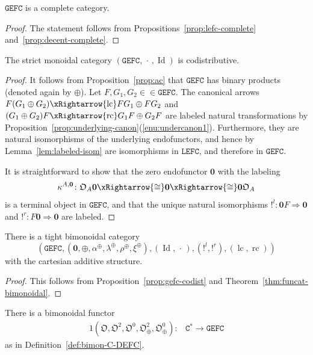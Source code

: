 \documentclass[10pt]{simplearticle}
\newcommand{\Id}{\operatorname{Id}}
\newcommand{\GEFC}{\mathbb{\mathtt{GEFC}}}
\newcommand{\LEFC}{\mathbb{\mathtt{LEFC}}}
\newcommand{\Cstar}{\mathtt{C^{*}}}
\newcommand{\au}{\alpha^{\oplus}}
\newcommand{\lu}{\lambda^{\oplus}}
\newcommand{\ru}{\rho^{\oplus}}
\newcommand{\bzero}{\boldsymbol{0}}
\newcommand{\Terminal}{\boldsymbol{!}}
\newcommand{\rc}{\operatorname{rc}}
\newcommand{\lc}{\operatorname{lc}}
\newcommand{\singledot}{\,\cdot\,}
\begin{document}
\begin{prop}\label{prop:ac}
$\GEFC$ is a complete category.
\end{prop}

\begin{proof}
The statement follows from Propositions~\ref{prop:lefc-complete}
and~\ref{prop:decent-complete}.
\end{proof}

\begin{prop}\label{prop:gefc-codist}
The strict monoidal category $(\GEFC,\singledot,\Id)$
is codistributive.
\end{prop}

\begin{proof}
It follows from Proposition~\ref{prop:ac} that $\GEFC$ has binary
products (denoted again by $\oplus$). Let $F,G_{1},G_{2}\in\in\GEFC$.
The canonical arrows $F(G_{1}\oplus G_{2})\xRightarrow{\lc}FG_{1}\oplus FG_{2}$
and $(G_{1}\oplus G_{2})F\xRightarrow{\rc}G_{1}F\oplus G_{2}F$ are
labeled natural transformations by Proposition~\ref{prop:underlying-canon}(\ref{enu:undercanon1}).
Furthermore, they are natural isomorphisms of the underlying endofunctors,
and hence by Lemma~\ref{lem:labeled-isom} are isomorphisms in $\LEFC$,
and therefore in $\GEFC$.

It is straightforward to show that the zero endofunctor $\bzero$
with the labeling
\[
\kappa^{A,\bzero}\colon\mathfrak{O}_{A}\bzero\xRightarrow{\cong}\bzero\xRightarrow{\cong}\bzero\mathfrak{O}_{A}
\]
is a terminal object in $\GEFC$, and that the unique natural isomorphisms
$\Terminal^{l}\colon\bzero F\Rightarrow\bzero$ and $\Terminal^{r}\colon F\bzero\Rightarrow\bzero$
are labeled.
\end{proof}

\begin{cor}
There is a tight bimonoidal category
\[
(\GEFC,(\bzero,\oplus,\au,\lu,\ru,\xi^{\oplus}),(\Id,\singledot),(\Terminal^{l},\Terminal^{r}),(\lc,\rc))
\]
with the cartesian additive structure.
\end{cor}

\begin{proof}
This follows from Proposition~\ref{prop:gefc-codist} and Theorem~\ref{thm:funcat-bimonoidal}.
\end{proof}

\begin{prop}
There is a bimonoidal functor
\begin{alignat}{1}
(\mathfrak{O},\mathfrak{O}^{2},\mathfrak{O}^{0},\mathfrak{O}^{2}_{\oplus},\mathfrak{O}^{0}_{\oplus})\colon & \Cstar\to\GEFC\label{eq:ogefc}
\end{alignat}
as in Definition~\ref{def:bimon-C-DEFC}.
\end{prop}
\end{document}
